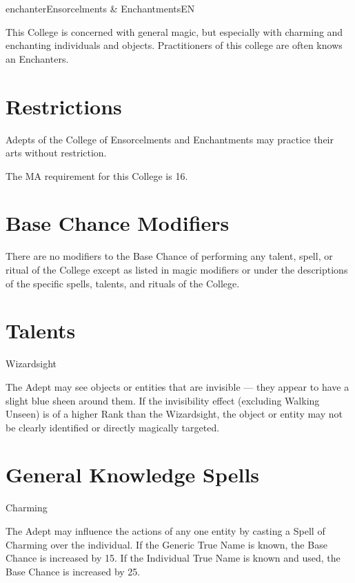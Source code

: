 \begin{College}[1.1]{enchanter}{Ensorcelments \& Enchantments}{EN}

This College is concerned with general magic, but especially with
charming and enchanting individuals and objects.  Practitioners of
this college are often knows an Enchanters.


\section{Restrictions}

Adepts of the College of Ensorcelments and Enchantments may practice
their arts without restriction.

The MA requirement for this College is 16. 


\section{Base Chance Modifiers}

There are no modifiers to the Base Chance of performing any talent,
spell, or ritual of the College except as listed in magic modifiers or
under the descriptions of the specific spells, talents, and rituals of
the College.


\section{Talents}

\begin{talent}[T-1]{Wizardsight}

\begin{effects}
The Adept may see objects or entities that are invisible — they appear
to have a slight blue sheen around them.  If the invisibility effect
(excluding Walking Unseen) is of a higher Rank than the Wizardsight,
the object or entity may not be clearly identified or directly
magically targeted.
\end{effects}
\end{talent}


\section{General Knowledge Spells}

\begin{spell}[G-1]{Charming}
\begin{effects}
The Adept may influence the actions of any one entity by casting a
Spell of Charming over the individual. If the Generic True Name is
known, the Base Chance is increased by 15. If the Individual True Name
is known and used, the Base Chance is increased by 25.


\end{effects}
\end{spell}
\end{College}
